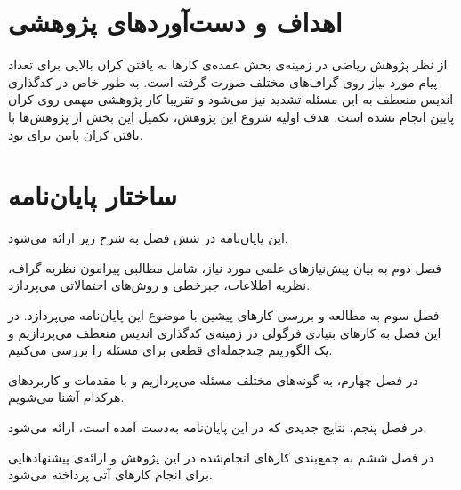 \pagebreak 
\section{اهداف و دست‌آورد‌های پژوهشی}
از نظر پژوهش ریاضی در زمینه‌ی \picod بخش عمده‌ی کارها به یافتن کران بالایی برای تعداد پیام مورد نیاز روی گراف‌های مختلف صورت گرفته است. به طور خاص در کدگذاری اندیس منعطف به این مسئله تشدید نیز می‌شود و تقریبا کار پژوهشی‌ مهمی روی کران پایین انجام نشده است. هدف اولیه شروع این پژوهش‌، تکمیل این بخش از پژوهش‌ها با یافتن کران پایین برای \picod بود.
\section{ساختار پایان‌نامه}

این پایان‌نامه در شش فصل به شرح زیر ارائه می‌شود.

فصل دوم به بیان پیش‌نیازهای علمی مورد نیاز، شامل مطالبی پیرامون نظریه گراف، نظریه اطلاعات، جبرخطی و روش‌های احتمالاتی می‌پردازد.

فصل سوم به مطالعه و بررسی کارهای پیشین با موضوع این پایان‌نامه می‌پردازد. در این فصل به کارهای بنیادی فرگولی در زمینه‌ی کدگذاری اندیس منعطف می‌پردازیم و یک الگوریتم چندجمله‌ای قطعی برای مسئله را بررسی می‌کنیم.

در فصل چهارم، به گونه‌های مختلف مسئله می‌پردازیم و با مقدمات و کاربردهای هرکدام آشنا می‌شویم.

در فصل پنجم، نتایج جدیدی که در این پایان‌نامه به‌دست آمده است، ارائه می‌شود.

در فصل ششم به جمع‌بندی کارهای انجام‌شده در این پژوهش و ارائه‌ی پیشنهادهایی برای انجام کارهای آتی پرداخته می‌شود.